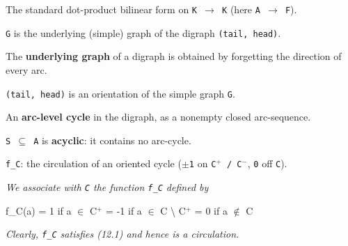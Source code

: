 \begin{definition}
\label{CycleSpace.dotForm}
\leanok
The standard dot-product bilinear form on \texttt{K $\to$ K} (here \texttt{A $\to$ F}).
\end{definition}

\begin{definition}
\label{CycleSpace.IsUnderlyingGraph}
\leanok
\texttt{G} is the underlying (simple) graph of the digraph \texttt{(tail, head)}.

The \textbf{underlying graph} of a
digraph is obtained by forgetting the direction of every arc.
\end{definition}

\begin{definition}
\label{CycleSpace.IsOrientationOf}
\leanok
{}
\texttt{(tail, head)} is an orientation of the simple graph \texttt{G}.
\end{definition}

\begin{definition}
\label{CycleSpace.ArcCycle}
An \textbf{arc-level cycle} in the digraph, as a nonempty closed arc-sequence.
\end{definition}

\begin{definition}
\label{CycleSpace.IsArcAcyclic}
\leanok
{}
\texttt{S $\subseteq$ A} is \textbf{acyclic}: it contains no arc-cycle.
\end{definition}

\begin{definition}
\label{CycleSpace.cycleCirculation}
\texttt{f\_C}: the circulation of an oriented cycle (\texttt{$\pm$1} on \texttt{C$^{+}$ / C$^{-}$}, \texttt{0} off \texttt{C}).

\emph{We associate with \texttt{C} the function \texttt{f\_C}
defined by}

f\_C(a) = 1   if a $\in$ C$^{+}$
           = -1  if a $\in$ C \textbackslash{} C$^{+}$
           = 0   if a $\notin$ C

\emph{Clearly, \texttt{f\_C} satisfies (12.1) and hence is a circulation.}
\end{definition}

